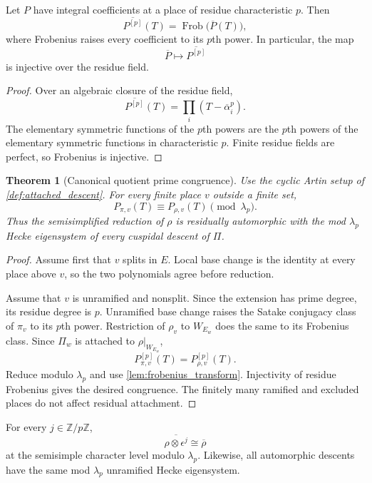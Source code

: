 \documentclass{aomart}
\newtheorem{theorem}{Theorem}[section]
\theoremstyle{definition}
\theoremstyle{remark}
\newcommand{\ZZ}{\mathbb Z}
\begin{document}
\begin{lemma}\label{lem:frobenius_transform}
Let \(P\) have integral coefficients at a place of residue characteristic \(p\). Then
\[
\boxed{
\overline{P^{[p]}}(T)
=
\operatorname{Frob}\bigl(\overline P(T)\bigr),
}
\]
where Frobenius raises every coefficient to its \(p\)th power. In particular, the map
\[
\overline P\longmapsto\overline{P^{[p]}}
\]
is injective over the residue field.
\end{lemma}

\begin{proof}
Over an algebraic closure of the residue field,
\[
\overline{P^{[p]}}(T)
=
\prod_i(T-\overline\alpha_i^p).
\]
The elementary symmetric functions of the \(p\)th powers are the \(p\)th powers of the elementary symmetric functions in characteristic \(p\). Finite residue fields are perfect, so Frobenius is injective.
\end{proof}

\begin{theorem}[Canonical quotient prime congruence]\label{thm:quotient_prime_congruence}
Use the cyclic Artin setup of \cref{def:attached_descent}. For every finite place \(v\) outside a finite set,
\[
\boxed{
P_{\pi,v}(T)
\equiv
P_{\rho,v}(T)
\pmod{\lambda_p}.
}
\]
Thus the semisimplified reduction of \(\rho\) is residually automorphic with the mod \(\lambda_p\) Hecke eigensystem of every cuspidal descent of \(\Pi\).
\end{theorem}

\begin{proof}
Assume first that \(v\) splits in \(E\). Local base change is the identity at every place above \(v\), so the two polynomials agree before reduction.

Assume that \(v\) is unramified and nonsplit. Since the extension has prime degree, its residue degree is \(p\). Unramified base change raises the Satake conjugacy class of \(\pi_v\) to its \(p\)th power. Restriction of \(\rho_v\) to \(W_{E_w}\) does the same to its Frobenius class. Since \(\Pi_w\) is attached to \(\rho|_{W_{E_w}}\),
\[
P_{\pi,v}^{[p]}(T)
=
P_{\rho,v}^{[p]}(T).
\]
Reduce modulo \(\lambda_p\) and use \cref{lem:frobenius_transform}. Injectivity of residue Frobenius gives the desired congruence. The finitely many ramified and excluded places do not affect residual attachment.
\end{proof}

\begin{corollary}\label{cor:twists_collapse_residually}
For every \(j\in\ZZ/p\ZZ\),
\[
\overline{\rho\otimes\epsilon^j}
\cong
\overline\rho
\]
at the semisimple character level modulo \(\lambda_p\). Likewise, all automorphic descents have the same mod \(\lambda_p\) unramified Hecke eigensystem.
\end{corollary}
\end{document}
